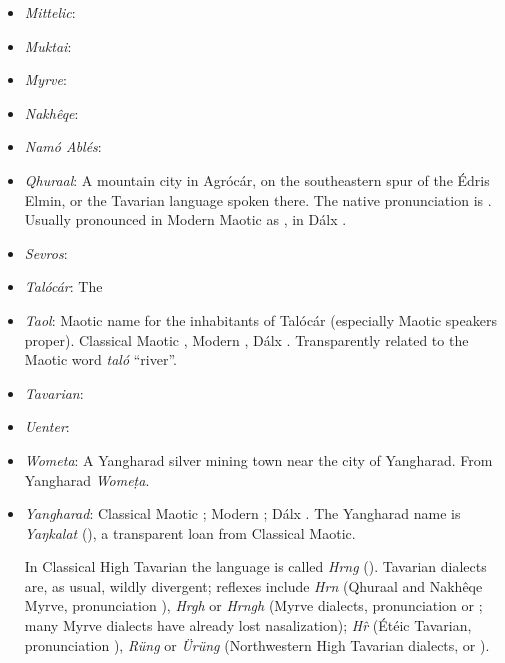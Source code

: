 \documentclass{article}
\begin{document}
\begin{itemize}
 \item \textit{Mittelic}:

 \item \textit{Muktai}:

 \item \textit{Myrve}:

 \item \textit{Nakhêqe}:

 \item \textit{Namó Ablés}:

 \item \textit{Qhuraal}: A mountain city in Agrócár, on the southeastern spur of the Édris Elmin, or the Tavarian language spoken there. The native pronunciation is . Usually pronounced in Modern Maotic as , in Dálx .

 \item \textit{Sevros}:

 \item \textit{Talócár}: The

 \item \textit{Taol}: Maotic name for the inhabitants of Talócár (especially Maotic speakers proper). Classical Maotic , Modern , Dálx . Transparently related to the Maotic word \textit{taló} ``river''.

 \item \textit{Tavarian}:

 \item \textit{Uenter}:

 \item \textit{Wometa}: A Yangharad silver mining town near the city of Yangharad. From Yangharad \textit{Wome\d{t}a}.

 \item \textit{Yangharad}: Classical Maotic ; Modern ; Dálx . The Yangharad name is \textit{Yaŋkalat} (), a transparent loan from Classical Maotic.

 In Classical High Tavarian the language is called \textit{Hrng} (). Tavarian dialects are, as usual, wildly divergent; reflexes include \textit{Hrn} (Qhuraal and Nakhêqe Myrve, pronunciation ), \textit{Hrgh} or \textit{Hrngh} (Myrve dialects, pronunciation  or ; many Myrve dialects have already lost nasalization); \textit{H\^{r}} (Étéic Tavarian, pronunciation ), \textit{Rüng} or \textit{Ürüng} (Northwestern High Tavarian dialects,  or ).


\end{itemize}
\end{document}
